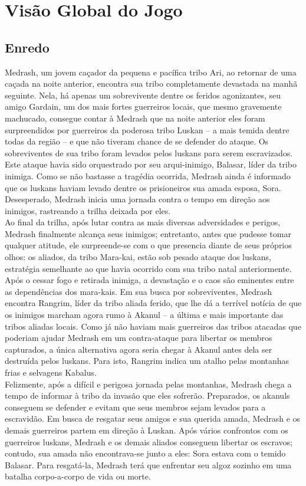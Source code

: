 \section{Visão Global do Jogo}

\subsection{Enredo}
Medrash, um jovem caçador da pequena e pacífica tribo Ari, ao retornar de
 uma caçada na noite anterior, encontra sua tribo completamente devastada 
na manhã seguinte. Nela, há apenas um sobrevivente dentre os feridos
 agonizantes, seu amigo Gardain, um dos mais fortes guerreiros locais, que
 mesmo gravemente machucado, consegue contar à Medrash que na noite anterior
 eles foram surpreendidos por guerreiros da poderosa tribo Luskan – a mais
 temida dentre todas da região – e que não tiveram chance de se defender 
do ataque. Os sobreviventes de sua tribo foram levados pelos luskans para
 serem escravizados. Este ataque havia sido orquestrado por seu 
arqui-inimigo, Balasar, líder da tribo inimiga. Como se não bastasse a
 tragédia ocorrida, Medrash ainda é informado que os luskans haviam levado
 dentre os prisioneiros sua amada esposa, Sora.  Desesperado, Medrash 
inicia uma jornada contra o tempo em direção aos inimigos, rastreando 
a trilha deixada por eles. \\
Ao final da trilha, após lutar contra as mais diversas adversidades e
 perigos, Medrash finalmente alcança seus inimigos; entretanto, antes que
 pudesse tomar qualquer atitude, ele  surpreende-se com o que presencia
 diante de seus próprios olhos: os aliados, da tribo Mara-kai, estão sob
 pesado ataque dos luskans, estratégia semelhante ao que havia ocorrido 
com sua tribo natal anteriormente. Após o cessar fogo e retirada inimiga,
 a devastação e o caos são eminentes entre as dependências dos mara-kais. 
Em sua busca por sobreviventes, Medrash encontra Rangrim, líder da tribo
 aliada ferido, que lhe dá a terrível notícia de que os inimigos marcham
 agora rumo à Akanul – a última e mais importante das tribos aliadas 
locais. Como já não haviam mais guerreiros das tribos atacadas que
 poderiam ajudar Medrash em um contra-ataque para libertar os membros
 capturados, a única alternativa agora seria chegar à Akanul antes dela 
ser destruída pelos luskans. Para isto, Rangrim indica um atalho pelas
 montanhas frias e selvagens Kabalus. \\
Felizmente, após a difícil e perigosa jornada pelas montanhas, Medrash 
chega a tempo de informar à tribo da invasão que eles sofrerão. Preparados,
 os akanuls conseguem se defender e evitam que seus membros sejam levados
 para a escravidão. Em busca de resgatar seus amigos e sua querida amada, 
Medrash e os demais guerreiros partem em direção à Luskan. Após vários
 confrontos com os guerreiros luskans, Medrash e os demais aliados 
conseguem libertar os escravos; contudo, sua amada não encontrava-se junto 
a eles: Sora estava com o temido Balasar. Para resgatá-la, Medrash terá que
 enfrentar seu algoz sozinho em uma batalha corpo-a-corpo de vida ou morte.
